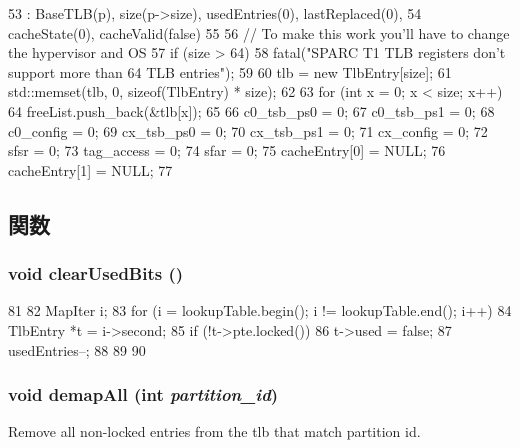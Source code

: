 \begin{DoxyCode}
53     : BaseTLB(p), size(p->size), usedEntries(0), lastReplaced(0),
54       cacheState(0), cacheValid(false)
55 {
56     // To make this work you'll have to change the hypervisor and OS
57     if (size > 64)
58         fatal("SPARC T1 TLB registers don't support more than 64 TLB entries");
59 
60     tlb = new TlbEntry[size];
61     std::memset(tlb, 0, sizeof(TlbEntry) * size);
62 
63     for (int x = 0; x < size; x++)
64         freeList.push_back(&tlb[x]);
65 
66     c0_tsb_ps0 = 0;
67     c0_tsb_ps1 = 0;
68     c0_config = 0;
69     cx_tsb_ps0 = 0;
70     cx_tsb_ps1 = 0;
71     cx_config = 0;
72     sfsr = 0;
73     tag_access = 0;
74     sfar = 0;
75     cacheEntry[0] = NULL;
76     cacheEntry[1] = NULL;
77 }
\end{DoxyCode}


\subsection{関数}
\hypertarget{classSparcISA_1_1TLB_aa4eb1561faa47c66c28555cbf26f4d8f}{
\subsubsection[{clearUsedBits}]{\setlength{\rightskip}{0pt plus 5cm}void clearUsedBits ()}}
\label{classSparcISA_1_1TLB_aa4eb1561faa47c66c28555cbf26f4d8f}



\begin{DoxyCode}
81 {
82     MapIter i;
83     for (i = lookupTable.begin(); i != lookupTable.end(); i++) {
84         TlbEntry *t = i->second;
85         if (!t->pte.locked()) {
86             t->used = false;
87             usedEntries--;
88         }
89     }
90 }
\end{DoxyCode}
\hypertarget{classSparcISA_1_1TLB_a787d07e454d0dddde90f226346065ade}{
\subsubsection[{demapAll}]{\setlength{\rightskip}{0pt plus 5cm}void demapAll (int {\em partition\_\-id})}}
\label{classSparcISA_1_1TLB_a787d07e454d0dddde90f226346065ade}
Remove all non-\/locked entries from the tlb that match partition id. 


